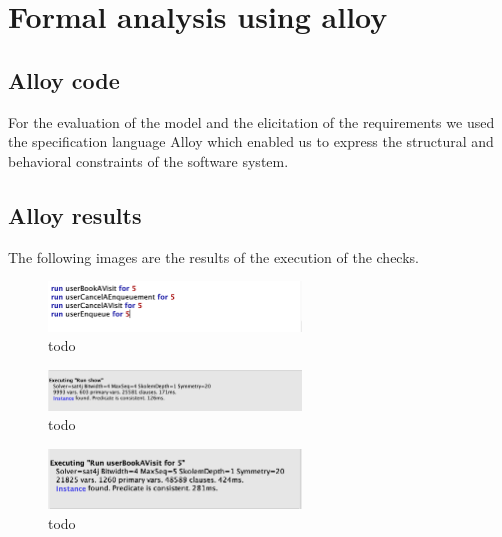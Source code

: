 \section{Formal analysis using alloy}
\label{sect:formalanalysisusingalloy}

\subsection{Alloy code}
\label{subsect:alloycode}

For the evaluation of the model and the elicitation of the requirements we used the specification language Alloy which enabled us to express the structural and behavioral constraints of the software system.


\subsection{Alloy results}
\label{subsect:alloyresults}

The following images are the results of the execution of the checks.

\begin{figure}[h!]
    \centering
    \includegraphics[width=0.6\textwidth]{Images/alloy/runs.png}
    \caption{\label{fig:runs}{todo}}
\end{figure}

\begin{figure}[h!]
    \centering
    \includegraphics[width=0.6\textwidth]{Images/alloy/runshow.png}
    \caption{\label{fig:runshow}{todo}}
\end{figure}

\begin{figure}[h!]
    \centering
    \includegraphics[width=0.6\textwidth]{Images/alloy/userbooksavisit.png}
    \caption{\label{fig:userbooksavisitalloy}{todo}}
\end{figure}

